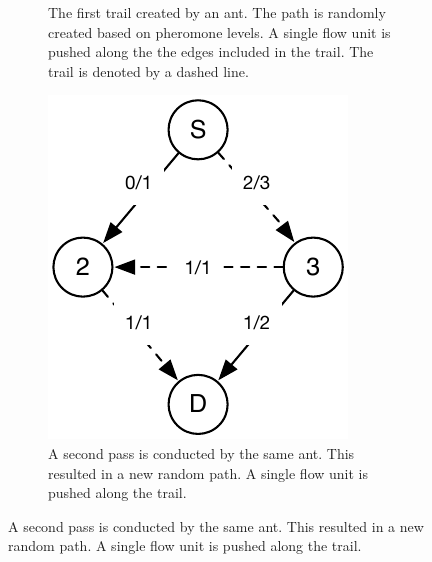 \begin{figure}[htp]
\begin{subfigure}[t]{0.30\textwidth}
  \caption{The first trail created by an ant. The path is randomly created based on pheromone levels. A single flow unit is pushed along the the edges included in the trail. The trail is denoted by a dashed line.}\label{fig:alternated_move_and_push_fig2}
\end{subfigure}
\quad
\begin{subfigure}[t]{0.30\textwidth}
  \centering
  \includegraphics[width=\linewidth,height=\linewidth, keepaspectratio]{alternated_move_and_push3.pdf}
  \caption{A second pass is conducted by the same ant. This resulted in a new random path. A single flow unit is pushed along the trail.}\label{fig:alternated_move_and_push_fig3}
\end{subfigure}


\end{figure}
